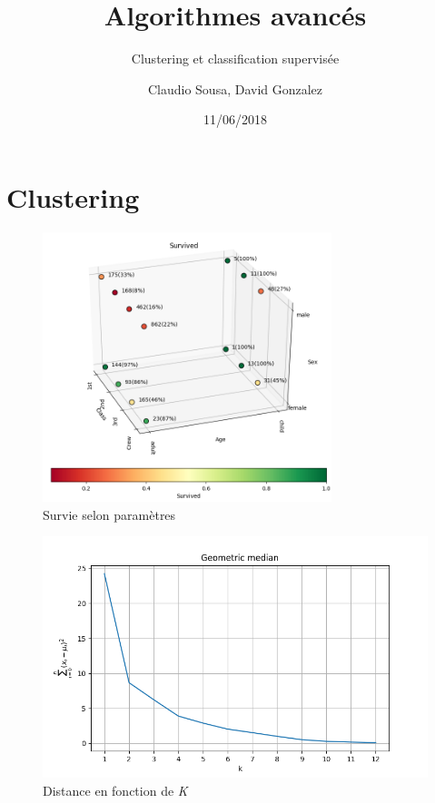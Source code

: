 \documentclass{beamer}
\title[]{Algorithmes avancés}
\subtitle{Clustering et classification supervisée}
\author{Claudio Sousa, David Gonzalez}
\institute{HEPIA}
\date{11/06/2018}
\begin{document}
\begin{frame}[plain]
    \titlepage
\end{frame}

\section{Clustering}

\begin{frame}[plain]
    \begin{figure}[H]
        \begin{center}
            \includegraphics[width=0.75\textwidth]{ex1_survived}
        \end{center}
        \caption{Survie selon paramètres}
        \label{Survie selon paramètres}
    \end{figure}
\end{frame}

\begin{frame}[plain]
    \begin{figure}[H]
        \begin{center}
            \includegraphics[width=1\textwidth]{ex1_geometric_median}
        \end{center}
        \caption{Distance en fonction de \textit{K}}
        \label{Distance en fonction de K}
    \end{figure}
\end{frame}
\end{document}
